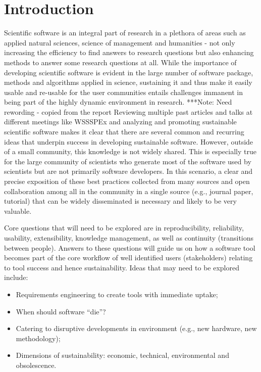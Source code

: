 \documentclass[11pt, oneside]{amsart}
\newcommand{\note}[1]{ {\textcolor{blueish}    { ***Note:      #1 }}}
\begin{document}
\maketitle
\newpage

\section{Introduction} \label{sec:intro}

Scientific software is an integral part of research in a plethora of areas such as applied natural sciences, science of management and humanities - not only increasing the efficiency to find answers to research questions but also enhancing methods to answer some research questions at all. While the importance of developing scientific software is evident in the large number of software package, methods and algorithms applied in science, sustaining it and thus make it easily usable and re-usable for the user communities entails challenges immanent in being part of the highly dynamic environment in research. 
\note{Need rewording - copied from the report}
Reviewing multiple past articles and talks at different meetings like WSSSPEx
\cite{WSSSPE1, WSSSPE2, 5069157, Blatt_WSSSPE, Ahern_WSSSPE} and analyzing and
promoting sustainable scientific software makes it clear that there are several
common and recurring ideas that underpin success in developing sustainable
software. However, outside of a small community, this knowledge is not widely
shared. This is especially true for the large community of scientists who
generate most of the software used by scientists but are not primarily software
developers. In this scenario, a clear and precise exposition of these best
practices collected from many sources and open collaboration among all in the
community in a single source (e.g., journal paper, tutorial) that can be widely
disseminated is necessary and likely to be very valuable.

Core questions that will need to be explored are in reproducibility, 
reliability,  usability, extensibility, knowledge management, as well as continuity
(transitions between people). Answers to these questions will guide us on how a software
tool becomes part of the core workflow of well identified users (stakeholders)
relating to tool success and hence sustainability.
Ideas  that may need to be explored include:
\begin{itemize}
\item Requirements engineering to create tools with immediate uptake;
\item When should software ``die''?
\item Catering to disruptive developments in environment (e.g., new hardware,
new methodology);
\item Dimensions of sustainability: economic, technical, environmental and
obsolescence. 
\end{itemize}
\end{document}
